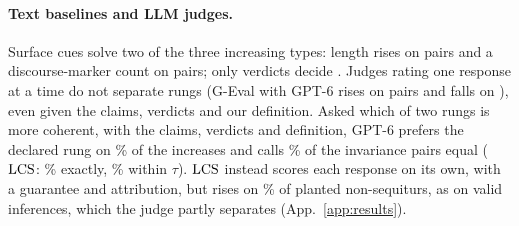 \paragraph{Text baselines and LLM judges.} Surface cues solve two of the three increasing types:
length rises on \sThreeBCtlLengthChain{}  pairs and a discourse-marker count on
\sThreeBCtlMarkersConflict{}  pairs; only verdicts decide . Judges rating one response at a time do not separate  rungs (G-Eval with GPT-6 rises on
\sThreeBGevalGptChain{} pairs and falls on \sThreeBGevalGptChainFalls), even given the claims, verdicts
and our definition. Asked which of two
rungs is more coherent, with the claims, verdicts and definition, GPT-6 prefers the declared rung on
\fjPairVIncRise\% of the increases and calls \fjPairVInvTie\% of the invariance pairs equal ($\mathrm{LCS}$:
\sThreeGraphGptLamInvPct\% exactly, \sThreeGraphGptLamInvTolPct\% within $\tau$). $\mathrm{LCS}$ instead scores
each response on its own, with a guarantee and attribution, but rises on \nsLcsRise\% of planted
non-sequiturs, as on valid inferences, which the judge partly separates (App.~\ref{app:results}).
